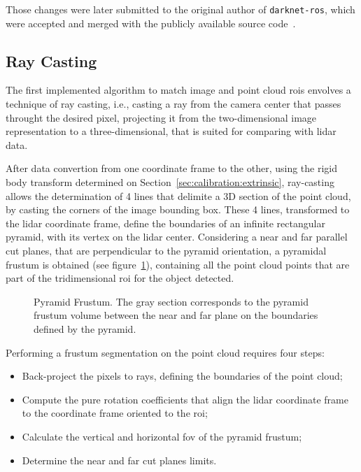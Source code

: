 Those changes were later submitted to the original author of \texttt{darknet-ros}, which were accepted and merged with the publicly available source code~\cite{MarkoBjelonic}.


\subsection{Ray Casting}
\label{subsec:object-detection:ray-casting}
The first implemented algorithm to match image and point cloud \acp{roi} envolves a technique of ray casting, i.e., casting a ray from the camera center that passes throught the desired pixel, projecting it from the two-dimensional image representation to a three-dimensional, that is suited for comparing with \ac{lidar} data.

After data convertion from one coordinate frame to the other, using the rigid body transform determined on Section~\ref{sec:calibration:extrinsic}, ray-casting allows the determination of 4 lines that delimite a 3D section of the point cloud, by casting the corners of the image bounding box. These 4 lines, transformed to the \ac{lidar} coordinate frame, define the boundaries of an infinite rectangular pyramid, with its vertex on the \ac{lidar} center. Considering a near and far parallel cut planes, that are perpendicular to the pyramid orientation, a pyramidal frustum is obtained (see figure~\ref{fig:pyramid-frustum}), containing all the point cloud points that are part of the tridimensional \ac{roi} for the object detected.  

\begin{figure}[H]
	\centering
	\def\svgwidth{0.3\columnwidth}
	\graphicspath{{img/image-object-to-point-cloud/}}
	
	\caption{Pyramid Frustum. The gray section corresponds to the pyramid frustum volume between the near and far plane on the boundaries defined by the pyramid.}
	\label{fig:pyramid-frustum}
\end{figure}

Performing a frustum segmentation on the point cloud requires four steps:

\begin{itemize}
	\item Back-project the pixels to rays, defining the boundaries of the point cloud;
	\item Compute the pure rotation coefficients that align the \ac{lidar} coordinate frame to the coordinate frame oriented to the \ac{roi};
	\item Calculate the vertical and horizontal \acf{fov} of the pyramid frustum;
	\item Determine the near and far cut planes limits.
\end{itemize}

